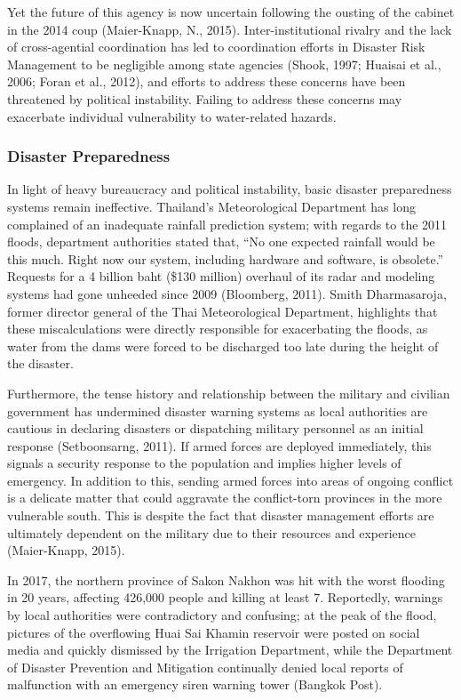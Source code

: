 Yet the future of this agency is now uncertain following the ousting of the cabinet in the 2014 coup (Maier-Knapp, N., 2015). Inter-institutional rivalry and the lack of cross-agential coordination has led to coordination efforts in Disaster Risk Management to be negligible among state agencies (Shook, 1997; Huaisai et al., 2006; Foran et al., 2012), and efforts to address these concerns have been threatened by political instability. Failing to address these concerns may exacerbate individual vulnerability to water-related hazards.

\subsubsection{Disaster Preparedness} 

In light of heavy bureaucracy and political instability, basic disaster preparedness systems remain ineffective. Thailand's Meteorological Department has long complained of an inadequate rainfall prediction system; with regards to the 2011 floods, department authorities stated that, ``No one expected rainfall would be this much. Right now our system, including hardware and software, is obsolete.'' Requests for a 4 billion baht (\$130 million) overhaul of its radar and modeling systems had gone unheeded since 2009 (Bloomberg, 2011). Smith Dharmasaroja, former director general of the Thai Meteorological Department, highlights that these miscalculations were directly responsible for exacerbating the floods, as water from the dams were forced to be discharged too late during the height of the disaster.

Furthermore, the tense history and relationship between the military and civilian government has undermined disaster warning systems as local authorities are cautious in declaring disasters or dispatching military personnel as an initial response (Setboonsarng, 2011). If armed forces are deployed immediately, this signals a security response to the population and implies higher levels of emergency. In addition to this, sending armed forces into areas of ongoing conflict is a delicate matter that could aggravate the conflict-torn provinces in the more vulnerable south. This is despite the fact that disaster management efforts are ultimately dependent on the military due to their resources and experience (Maier-Knapp, 2015). 

In 2017, the northern province of Sakon Nakhon was hit with the worst flooding in 20 years, affecting 426,000 people and killing at least 7. Reportedly, warnings by local authorities were contradictory and confusing; at the peak of the flood, pictures of the overflowing Huai Sai Khamin reservoir were posted on social media and quickly dismissed by the Irrigation Department, while the Department of Disaster Prevention and Mitigation continually denied local reports of malfunction with an emergency siren warning tower (Bangkok Post). 

